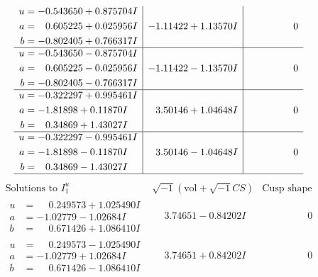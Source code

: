 \documentclass[1p]{elsarticle_modified}
\theoremstyle{definition}
\newcommand{\I}{\sqrt{-1}}
\begin{document}
$$\begin{array}{c|c|c}
\begin{aligned}
u &= -0.543650 + 0.875704 I \\
a &= \phantom{-}0.605225 + 0.025956 I \\
b &= -0.802405 + 0.766317 I\end{aligned}
 & -1.11422 + 1.13570 I & \phantom{-0.000000 } 0 \\ \hline\begin{aligned}
u &= -0.543650 - 0.875704 I \\
a &= \phantom{-}0.605225 - 0.025956 I \\
b &= -0.802405 - 0.766317 I\end{aligned}
 & -1.11422 - 1.13570 I & \phantom{-0.000000 } 0 \\ \hline\begin{aligned}
u &= -0.322297 + 0.995461 I \\
a &= -1.81898 + 0.11870 I \\
b &= \phantom{-}0.34869 + 1.43027 I\end{aligned}
 & \phantom{-}3.50146 + 1.04648 I & \phantom{-0.000000 } 0 \\ \hline\begin{aligned}
u &= -0.322297 - 0.995461 I \\
a &= -1.81898 - 0.11870 I \\
b &= \phantom{-}0.34869 - 1.43027 I\end{aligned}
 & \phantom{-}3.50146 - 1.04648 I & \phantom{-0.000000 } 0\\
 \hline 
 \end{array}$$\newpage$$\begin{array}{c|c|c}  
\text{Solutions to }I^u_{1}& \I (\text{vol} + \sqrt{-1}CS) & \text{Cusp shape}\\
 \hline 
\begin{aligned}
u &= \phantom{-}0.249573 + 1.025490 I \\
a &= -1.02779 - 1.02684 I \\
b &= \phantom{-}0.671426 + 1.086410 I\end{aligned}
 & \phantom{-}3.74651 - 0.84202 I & \phantom{-0.000000 } 0 \\ \hline\begin{aligned}
u &= \phantom{-}0.249573 - 1.025490 I \\
a &= -1.02779 + 1.02684 I \\
b &= \phantom{-}0.671426 - 1.086410 I\end{aligned}
 & \phantom{-}3.74651 + 0.84202 I & \phantom{-0.000000 } 0 \\ \hline\begin{aligned}

\end{aligned}
\end{array}$$
\end{document}
